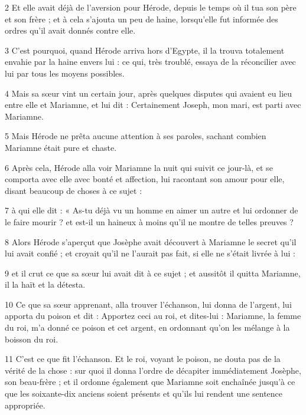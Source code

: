 \par 2 Et elle avait déjà de l'aversion pour Hérode, depuis le temps où il tua son père et son frère ; et à cela s'ajouta un peu de haine, lorsqu'elle fut informée des ordres qu'il avait donnés contre elle.

\par 3 C'est pourquoi, quand Hérode arriva hors d'Egypte, il la trouva totalement envahie par la haine envers lui : ce qui, très troublé, essaya de la réconcilier avec lui par tous les moyens possibles.

\par 4 Mais sa sœur vint un certain jour, après quelques disputes qui avaient eu lieu entre elle et Mariamne, et lui dit : Certainement Joseph, mon mari, est parti avec Mariamne.

\par 5 Mais Hérode ne prêta aucune attention à ses paroles, sachant combien Mariamne était pure et chaste.

\par 6 Après cela, Hérode alla voir Mariamne la nuit qui suivit ce jour-là, et se comporta avec elle avec bonté et affection, lui racontant son amour pour elle, disant beaucoup de choses à ce sujet :

\par 7 à qui elle dit : « As-tu déjà vu un homme en aimer un autre et lui ordonner de le faire mourir ? et est-il un haineux à moins qu'il ne montre de telles preuves ?

\par 8 Alors Hérode s'aperçut que Josèphe avait découvert à Mariamne le secret qu'il lui avait confié ; et croyait qu'il ne l'aurait pas fait, si elle ne s'était livrée à lui :

\par 9 et il crut ce que sa sœur lui avait dit à ce sujet ; et aussitôt il quitta Mariamne, il la haït et la détesta.

\par 10 Ce que sa sœur apprenant, alla trouver l'échanson, lui donna de l'argent, lui apporta du poison et dit : Apportez ceci au roi, et dites-lui : Mariamne, la femme du roi, m'a donné ce poison et cet argent, en ordonnant qu'on les mélange à la boisson du roi.

\par 11 C'est ce que fit l'échanson. Et le roi, voyant le poison, ne douta pas de la vérité de la chose : sur quoi il donna l'ordre de décapiter immédiatement Josèphe, son beau-frère ; et il ordonne également que Mariamne soit enchaînée jusqu'à ce que les soixante-dix anciens soient présents et qu'ils lui rendent une sentence appropriée.

